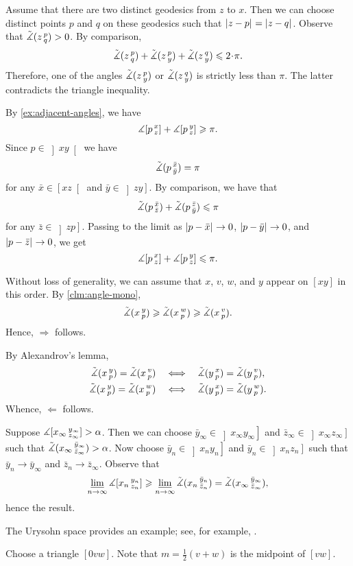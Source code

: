 Assume that there are two distinct geodesics from $z$ to $x$.
Then we can choose distinct points $p$ and $q$ on these geodesics such that $|{z}-{p}|_{}^{{}}=|{z}-{q}|_{}^{{}}$.
Observe that $\tilde\measuredangle(z\,{}^{p}_{q})>0$.
By comparison,
\[\angk zpq+\angk zpy+\angk zqy\le 2\cdot\pi.\]
Therefore, one of the angles $\tilde\measuredangle(z\,{}^{p}_{y})$ or $\tilde\measuredangle(z\,{}^{q}_{y})$ is strictly less than $\pi$.
The latter contradicts the triangle inequality.

By \ref{ex:adjacent-angles}, we have
\[\measuredangle[p\,{}^{x}_{z}]+\measuredangle[p\,{}^{y}_{z}]\geqslant \pi.\]
Since $p\in \left]xy\right[$ we have
\[\tilde\measuredangle(p\,{}^{\bar x}_{\bar y})=\pi\]
for any $\bar x\in \left[xz\right[$ and $\bar y\in \left]zy\right]$.
By comparison, we have that 
\[\tilde\measuredangle(p\,{}^{\bar x}_{\bar z})+\tilde\measuredangle(p\,{}^{\bar z}_{\bar y})\leqslant\pi\]
for any $\bar z\in \left]zp\right]$.
Passing to the limit as
$|{p}-{\bar x}|_{}^{{}}\to 0$,
$|{p}-{\bar y}|_{}^{{}}\to 0$, and
$|{p}-{\bar z}|_{}^{{}}\to 0$,
we get \[\measuredangle[p\,{}^{x}_{z}]+\measuredangle[p\,{}^{y}_{z}]\leqslant \pi.\]

Without loss of generality, we can assume that $x$, $v$, $w$, and $y$ appear on 
$[xy]$ in this order.
By \ref{clm:angle-mono},
\[
\tilde\measuredangle(x\,{}^{y}_{p})\geqslant \tilde\measuredangle(x\,{}^{w}_{p}) \geqslant\tilde\measuredangle(x\,{}^{v}_{p}).
\]
Hence, $\Rightarrow$ follows.

By Alexandrov's lemma,
\begin{align*}
\tilde\measuredangle(x\,{}^{y}_{p})=\tilde\measuredangle(x\,{}^{v}_{p})
\quad&\Longleftrightarrow\quad
\tilde\measuredangle(y\,{}^{x}_{p})=\tilde\measuredangle(y\,{}^{v}_{p}),
\\
\tilde\measuredangle(x\,{}^{y}_{p})=\tilde\measuredangle(x\,{}^{w}_{p})
\quad&\Longleftrightarrow\quad
\tilde\measuredangle(y\,{}^{x}_{p})=\tilde\measuredangle(y\,{}^{w}_{p}).
\end{align*}
Whence, $\Leftarrow$ follows.

 Suppose $\measuredangle [x_\infty\,{}^{y_\infty}_{z_\infty}]>\alpha$.
Then we can choose $\bar y_\infty\in\left]x_\infty y_\infty\right]$
and $\bar z_\infty\in\left]x_\infty z_\infty\right]$ such that 
$\tilde\measuredangle(x_\infty\,{}^{\bar y_\infty}_{\bar z_\infty})>\alpha$.
Now choose $\bar y_n\in\left]x_n y_n\right]$ and $\bar y_n\in\left]x_n z_n\right]$ such that $\bar y_n\to \bar y_\infty$ and $\bar z_n\to \bar z_\infty$.
Observe that 
\[\varliminf_{n\to\infty}\measuredangle [x_n\,{}^{y_n}_{z_n}]\geqslant\varliminf_{n\to\infty}\tilde\measuredangle(x_n\,{}^{\bar y_n}_{\bar z_n}) = \tilde\measuredangle(x_\infty\,{}^{\bar y_\infty}_{\bar z_\infty}),\]
hence the result.

The Urysohn space provides an example;
see, for example, \cite[Lecture 2]{petrunin2023pure}.

Choose a triangle $[0vw]$.
Note that $m=\tfrac12(v+w)$ is the midpoint of $[vw]$.

